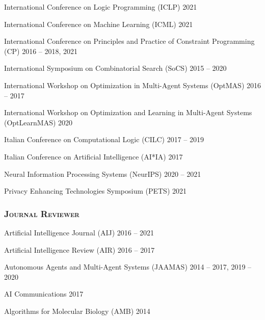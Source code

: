   \item International Conference on Logic Programming (ICLP) \hfill {2021}
  
  \item International Conference on Machine Learning (ICML) \hfill{2021} 

  \item International Conference on Principles and Practice of Constraint Programming (CP) \hfill{2016 -- 2018, 2021} 

  \item International Symposium on Combinatorial Search (SoCS) \hfill {2015 -- 2020}

  \item International Workshop on Optimization in Multi-Agent Systems (OptMAS) \hfill {2016 -- 2017}

  \item International Workshop on Optimization and Learning in Multi-Agent Systems (OptLearnMAS) \hfill {2020}

  \item Italian Conference on Computational Logic (CILC) \hfill {2017 -- 2019}

  \item Italian Conference on Artificial Intelligence (AI*IA) \hfill {2017}

  \item Neural Information Processing Systems (NeurIPS) \hfill {2020 -- 2021}

  \item Privacy Enhancing Technologies Symposium (PETS) \hfill {2021}
\endList

\subsubsection*{\scshape Journal Reviewer}{}{}{}
\beginList

  \item Artificial Intelligence Journal (AIJ) \hfill{2016 -- 2021}

  \item Artificial Intelligence Review (AIR) \hfill{2016 -- 2017}
  
  \item Autonomous Agents and Multi-Agent Systems (JAAMAS) \hfill {2014 -- 2017, 2019 -- 2020}
  
  \item AI Communications \hfill{2017}
  
  \item Algorithms for Molecular Biology (AMB) \hfill {2014}
  
